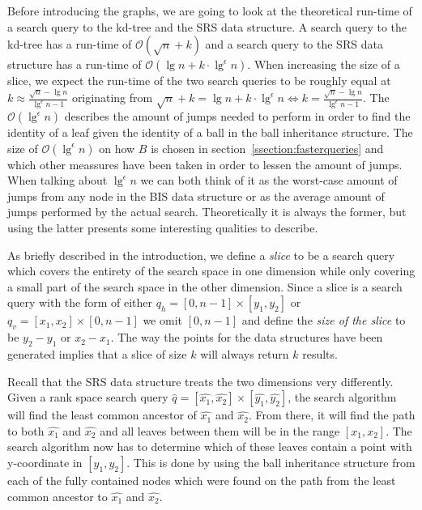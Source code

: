 Before introducing the graphs, we are going to look at the theoretical run-time of a search query to the kd-tree and the SRS data structure. A search query to the kd-tree has a run-time of $\mathcal{O}(\sqrt{n}+k)$ and a search query to the SRS data structure has a run-time of $\mathcal{O}(\lg n + k \cdot \lg^\epsilon n)$. When increasing the size of a slice, we expect the run-time of the two search queries to be roughly equal at $k \approx \frac{\sqrt{n} - \lg n}{\lg^\epsilon n - 1}$ originating from $\sqrt{n} + k = \lg n + k \cdot \lg^\epsilon n \Leftrightarrow k = \frac{\sqrt{n} - \lg n}{\lg^\epsilon n - 1}$. The $\mathcal{O}(\lg^\epsilon n)$ describes the amount of jumps needed to perform in order to find the identity of a leaf given the identity of a ball in the ball inheritance structure. The size of $\mathcal{O}(\lg^\epsilon n)$ on how $B$ is chosen in section~\ref{ssection:fasterqueries} and which other meassures have been taken in order to lessen the amount of jumps. When talking about $\lg^\epsilon n$ we can both think of it as the worst-case amount of jumps from any node in the BIS data structure or as the average amount of jumps performed by the actual search. Theoretically it is always the former, but using the latter presents some interesting qualities to describe.

As briefly described in the introduction, we define a \emph{slice} to be a search query which covers the entirety of the search space in one dimension while only covering a small part of the search space in the other dimension. Since a slice is a search query with the form of either $q_h = [0, n-1] \times [y_1, y_2]$ or $q_v = [x_1, x_2] \times [0, n-1]$ we omit $[0, n-1]$ and define the \emph{size of the slice} to be $y_2-y_1$ or $x_2-x_1$. The way the points for the data structures have been generated implies that a slice of size $k$ will always return $k$ results.

Recall that the SRS data structure treats the two dimensions very differently. Given a rank space search query $\hat{q} = [\hat{x_1}, \hat{x_2}] \times [\hat{y_1}, \hat{y_2}]$, the search algorithm will find the least common ancestor of $\hat{x_1}$ and $\hat{x_2}$. From there, it will find the path to both $\hat{x_1}$ and $\hat{x_2}$ and all leaves between them will be in the range $[x_1, x_2]$. The search algorithm now has to determine which of these leaves contain a point with y-coordinate in $[y_1, y_2]$. This is done by using the ball inheritance structure from each of the fully contained nodes which were found on the path from the least common ancestor to $\hat{x_1}$ and $\hat{x_2}$.


